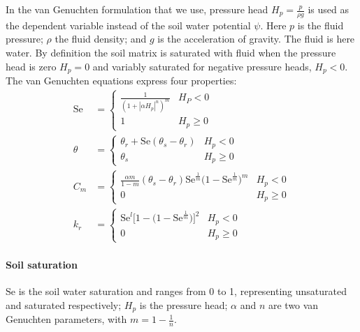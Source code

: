 In the van Genuchten formulation that we use, pressure head $H_p = \frac{p}{\rho g}$ is used as the dependent variable instead of the soil water potential $\psi$.
Here $p$ is the fluid pressure; $\rho$ the fluid density; and $g$ is the acceleration of gravity.
The fluid is here water.
By definition the soil matrix is saturated with fluid when the pressure head is zero $H_p = 0$ and variably saturated for negative pressure heads, $H_p < 0$.
The van Genuchten equations express four properties:
\begin{align}
  \mathrm{Se} &=
    \begin{cases}\label{eq:van_genuchten_saturation}
      \frac{1}{(1 + |\alpha H_p|^n)^m} & H_P < 0 \\
    1 & H_p \geq 0
    \end{cases} \\
  \theta &=
    \begin{cases}\label{eq:van_genuchten_soil_moisture}
      \theta_r + \mathrm{Se}(\theta_s - \theta_r) & H_p < 0 \\
      \theta_s & H_p \geq 0
    \end{cases} \\
  C_m &=
    \begin{cases}\label{eq:van_genuchten_moisture_capacity}
      \frac{\alpha m}{1-m}(\theta_s - \theta_r)\mathrm{Se}^{\frac{1}{m}}\big( 1 - \mathrm{Se}^{\frac{1}{m}} \big)^m & H_p < 0 \\
    0 & H_p \geq 0
    \end{cases} \\
  k_r &=
    \begin{cases}\label{eq:van_genuchten_relative_permeability}
      \mathrm{Se}^l \big[ 1 - \big( 1 - \mathrm{Se}^\frac{1}{m} \big) \big]^2 & H_p < 0 \\
      0 & H_p \geq 0
    \end{cases}
\end{align}

\paragraph{Soil saturation}

$\mathrm{Se}$ is the soil water saturation and ranges from 0 to 1, representing unsaturated and saturated respectively; $H_p$ is the pressure head; $\alpha$ and $n$ are two van Genuchten parameters, with $m = 1 - \frac{1}{n}$.

